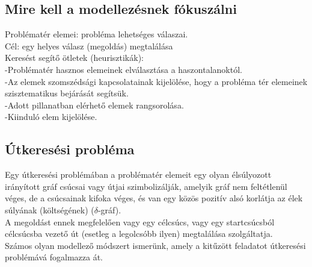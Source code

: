 \documentclass{article}
\begin{document}
	\subsection{Mire kell a modellezésnek fókuszálni}
	Problématér elemei: probléma lehetséges válaszai.\\
	Cél: egy helyes válasz (megoldás) megtalálása\\
	Keresést segítő ötletek (heurisztikák): \\
	-Problématér hasznos elemeinek elválasztása a haszontalanoktól.\\
	-Az elemek szomszédsági kapcsolatainak kijelölése, hogy a probléma tér elemeinek szisztematikus bejárását segítsük.\\
	-Adott pillanatban elérhető elemek rangsorolása.\\
	-Kiinduló elem kijelölése.\\
	
	\subsection{Útkeresési probléma}
	Egy útkeresési problémában a problématér elemeit egy olyan élsúlyozott irányított gráf csúcsai vagy útjai szimbolizálják, amelyik gráf nem feltétlenül véges, de a csúcsainak kifoka véges, és van egy közös pozitív alsó korlátja az élek súlyának (költségének) ($\delta$-gráf).\\
	A megoldást ennek megfelelően vagy egy célcsúcs, vagy egy startcsúcsból célcsúcsba vezető út (esetleg a legolcsóbb ilyen) megtalálása szolgáltatja.\\
	Számos olyan modellező módszert ismerünk, amely a kitűzött feladatot útkeresési problémává fogalmazza át.
	
\end{document}
